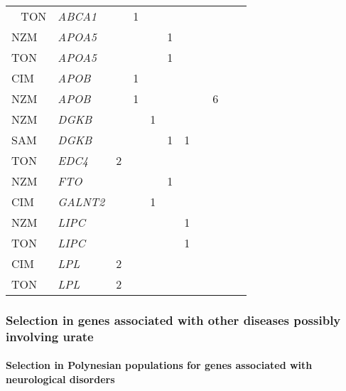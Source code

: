 \documentclass[]{report}
\let\oldparagraph\paragraph
\renewcommand{\paragraph}[1]{\oldparagraph{#1}\mbox{}}
\begin{document}
\begin{ThreePartTable}
\begin{longtable}[t]{lllllllllll}
\midrule
\endhead
\
\endfoot
\bottomrule
\insertTableNotes
\endlastfoot
TON & \em{ABCA1} &  & 1 &  &  &  &  &  &  & \\
NZM & \em{APOA5} &  &  &  & 1 &  &  &  &  & \\
TON & \em{APOA5} &  &  &  & 1 &  &  &  &  & \\
CIM & \em{APOB} &  & 1 &  &  &  &  &  &  & \\
NZM & \em{APOB} &  & 1 &  &  &  &  & 6 &  & \\
\addlinespace
NZM & \em{DGKB} &  &  & 1 &  &  &  &  &  & \\
SAM & \em{DGKB} &  &  &  & 1 & 1 &  &  &  & \\
TON & \em{EDC4} & 2 &  &  &  &  &  &  &  & \\
NZM & \em{FTO} &  &  &  & 1 &  &  &  &  & \\
CIM & \em{GALNT2} &  &  & 1 &  &  &  &  &  & \\
\addlinespace
NZM & \em{LIPC} &  &  &  &  & 1 &  &  &  & \\
TON & \em{LIPC} &  &  &  &  & 1 &  &  &  & \\
CIM & \em{LPL} & 2 &  &  &  &  &  &  &  & \\
TON & \em{LPL} & 2 &  &  &  &  &  &  &  & \\*
\end{longtable}
\end{ThreePartTable}

\endgroup{}

\subsubsection{Selection in genes associated with other diseases
possibly involving
urate}\label{selection-in-genes-associated-with-other-diseases-possibly-involving-urate}

\paragraph{Selection in Polynesian populations for genes associated with
neurological
disorders}\label{selection-in-polynesian-populations-for-genes-associated-with-neurological-disorders}
\end{document}
